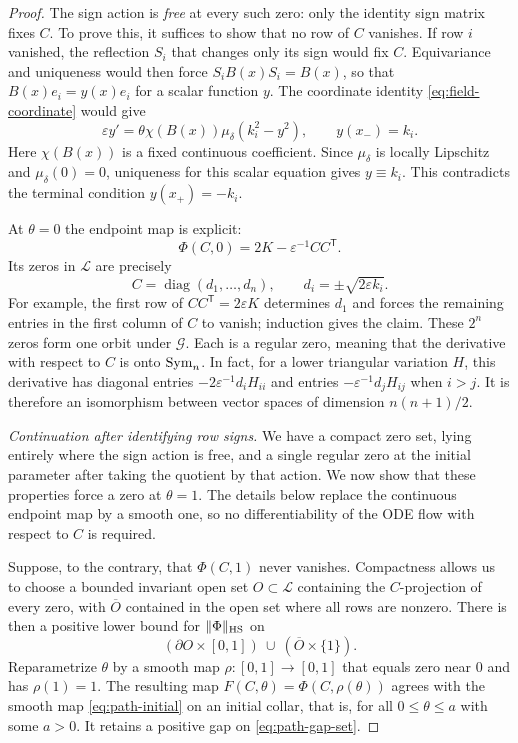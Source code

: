 \begin{proof}
The sign action is \emph{free} at every such zero: only the identity
sign matrix fixes $C$.  To prove this, it suffices to show that no row
of $C$ vanishes.  If row $i$ vanished, the reflection $S_i$ that changes
only its sign would fix $C$.  Equivariance and uniqueness would then
force $S_iB(x)S_i=B(x)$, so that $B(x)e_i=y(x)e_i$ for a scalar
function $y$.  The coordinate identity
\eqref{eq:field-coordinate} would give
\[
    \varepsilon y'
       =\theta\chi(B(x))\mu_\delta(k_i^2-y^2),
    \qquad y(x_-)=k_i.
\]
Here $\chi(B(x))$ is a fixed continuous coefficient.  Since
$\mu_\delta$ is locally Lipschitz and $\mu_\delta(0)=0$, uniqueness
for this scalar equation gives $y\equiv k_i$.  This contradicts the
terminal condition $y(x_+)=-k_i$.

At $\theta=0$ the endpoint map is explicit:
\begin{equation}
\label{eq:path-initial}
    \Phi(C,0)=2K-\varepsilon^{-1}CC^{\mathsf T}.
\end{equation}
Its zeros in $\mathcal L$ are precisely
\[
    C=\operatorname{diag}(d_1,\ldots,d_n),
    \qquad d_i=\pm\sqrt{2\varepsilon k_i}.
\]
For example, the first row of $CC^{\mathsf T}=2\varepsilon K$
determines $d_1$ and forces the remaining entries in the first column
of $C$ to vanish; induction gives the claim.  These $2^n$ zeros form
one orbit under $\mathcal G$.  Each is a regular zero, meaning that
the derivative with respect to $C$ is onto $\operatorname{Sym}_n$.  In fact, for a
lower triangular variation $H$, this derivative has diagonal entries
$-2\varepsilon^{-1}d_iH_{ii}$ and entries
$-\varepsilon^{-1}d_jH_{ij}$ when $i>j$.  It is therefore an
isomorphism between vector spaces of dimension $n(n+1)/2$.

\smallskip
\noindent\emph{Continuation after identifying row signs.}
We have a compact zero set, lying entirely where the sign action is
free, and a single regular zero at the initial parameter after taking
the quotient by that action.  We now show that these properties force
a zero at $\theta=1$.  The details below replace the continuous
endpoint map by a smooth one, so no differentiability of the ODE flow
with respect to $C$ is required.

Suppose, to the contrary, that $\Phi(C,1)$ never vanishes.  Compactness
allows us to choose a bounded invariant open set $O\subset\mathcal L$
containing the $C$-projection of every zero, with $\overline O$ contained
in the open set where all rows are nonzero.  There is then a positive
lower bound for $\|\Phi\|_{\mathrm{HS}}$ on
\begin{equation}
\label{eq:path-gap-set}
    (\partial O\times[0,1])\ \cup\ (\overline O\times\{1\}).
\end{equation}
Reparametrize $\theta$ by a smooth map $\rho:[0,1]\to[0,1]$ that
equals zero near $0$ and has $\rho(1)=1$.  The resulting map
$F(C,\theta)=\Phi(C,\rho(\theta))$ agrees with the smooth map
\eqref{eq:path-initial} on an initial collar, that is, for all
$0\leq\theta\leq a$ with some $a>0$.  It retains a positive gap on
\eqref{eq:path-gap-set}.


\end{proof}
